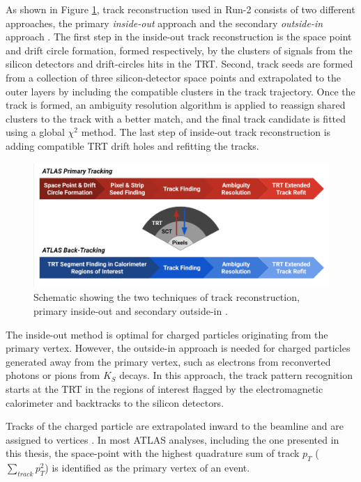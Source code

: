 As shown in Figure \ref{fig:TrackingOutline}, track reconstruction used in Run-2 consists of two different approaches, the primary \textit{inside-out} approach and the secondary \textit{outside-in} approach \cite{TrackingRun2_ATLAS}. The first step in the inside-out track reconstruction is the space point and drift circle formation, formed respectively, by the clusters of signals from the silicon detectors and drift-circles hits in the TRT. Second, track seeds are formed from a collection of three silicon-detector space points and extrapolated to the outer layers by including the compatible clusters in the track trajectory. Once the track is formed, an ambiguity resolution algorithm is applied to reassign shared clusters to the track with a better match, and the final track candidate is fitted using a global $\chi^{2}$ method. The last step of inside-out track reconstruction is adding compatible TRT drift holes and refitting the tracks. 

\begin{figure}[!htb]
    \centering
    \includegraphics[width=.9\linewidth]{figures/LHC/trackingflowchart.png}
    \caption{Schematic showing the two techniques of track reconstruction, primary inside-out and secondary outside-in \cite{TrackingPic}. \label{fig:TrackingOutline}} 
\end{figure}

The inside-out method is optimal for charged particles originating from the primary vertex. However, the outside-in approach is needed for charged particles generated away from the primary vertex, such as electrons from reconverted photons or pions from $K_{S}$ decays. In this approach, the track pattern recognition starts at the TRT in the regions of interest flagged by the electromagnetic calorimeter and backtracks to the silicon detectors. 

Tracks of the charged particle are extrapolated inward to the beamline and are assigned to vertices \cite{VertexReconstruction}. In most ATLAS analyses, including the one presented in this thesis, the space-point with the highest quadrature sum of track $p_T$ ($\sum_{track}{p_{T}^2}$) is identified as the primary vertex of an event.

